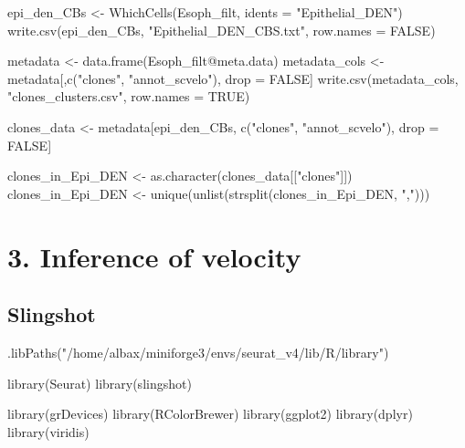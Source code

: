 \documentclass[
  letterpaper,
  DIV=11,
  numbers=noendperiod]{scrreprt}
\newenvironment{Shaded}{\begin{snugshade}}{\end{snugshade}}
\newcommand{\AttributeTok}[1]{\textcolor[rgb]{0.40,0.45,0.13}{#1}}
\newcommand{\ConstantTok}[1]{\textcolor[rgb]{0.56,0.35,0.01}{#1}}
\newcommand{\FunctionTok}[1]{\textcolor[rgb]{0.28,0.35,0.67}{#1}}
\newcommand{\NormalTok}[1]{\textcolor[rgb]{0.00,0.23,0.31}{#1}}
\newcommand{\OtherTok}[1]{\textcolor[rgb]{0.00,0.23,0.31}{#1}}
\newcommand{\SpecialCharTok}[1]{\textcolor[rgb]{0.37,0.37,0.37}{#1}}
\newcommand{\StringTok}[1]{\textcolor[rgb]{0.13,0.47,0.30}{#1}}
\begin{document}
\begin{Shaded}
\begin{Highlighting}[]
\NormalTok{epi\_den\_CBs }\OtherTok{\textless{}{-}} \FunctionTok{WhichCells}\NormalTok{(Esoph\_filt, }\AttributeTok{idents =} \StringTok{"Epithelial\_DEN"}\NormalTok{)}
\FunctionTok{write.csv}\NormalTok{(epi\_den\_CBs, }\StringTok{"Epithelial\_DEN\_CBS.txt"}\NormalTok{, }\AttributeTok{row.names =} \ConstantTok{FALSE}\NormalTok{)}

\NormalTok{metadata }\OtherTok{\textless{}{-}} \FunctionTok{data.frame}\NormalTok{(Esoph\_filt}\SpecialCharTok{@}\NormalTok{meta.data)}
\NormalTok{metadata\_cols }\OtherTok{\textless{}{-}}\NormalTok{ metadata[,}\FunctionTok{c}\NormalTok{(}\StringTok{"clones"}\NormalTok{, }\StringTok{"annot\_scvelo"}\NormalTok{), drop }\OtherTok{=} \ConstantTok{FALSE}\NormalTok{]}
\FunctionTok{write.csv}\NormalTok{(metadata\_cols, }\StringTok{"clones\_clusters.csv"}\NormalTok{, }\AttributeTok{row.names =} \ConstantTok{TRUE}\NormalTok{)}

\NormalTok{clones\_data }\OtherTok{\textless{}{-}}\NormalTok{ metadata[epi\_den\_CBs, }\FunctionTok{c}\NormalTok{(}\StringTok{"clones"}\NormalTok{, }\StringTok{"annot\_scvelo"}\NormalTok{), drop }\OtherTok{=} \ConstantTok{FALSE}\NormalTok{]}

\NormalTok{clones\_in\_Epi\_DEN }\OtherTok{\textless{}{-}} \FunctionTok{as.character}\NormalTok{(clones\_data[[}\StringTok{"clones"}\NormalTok{]])}
\NormalTok{clones\_in\_Epi\_DEN }\OtherTok{\textless{}{-}} \FunctionTok{unique}\NormalTok{(}\FunctionTok{unlist}\NormalTok{(}\FunctionTok{strsplit}\NormalTok{(clones\_in\_Epi\_DEN, }\StringTok{","}\NormalTok{)))}
\end{Highlighting}
\end{Shaded}

\chapter{3. Inference of velocity}\label{inference-of-velocity}

\section{Slingshot}\label{slingshot}

\begin{Shaded}
\begin{Highlighting}[]
\FunctionTok{.libPaths}\NormalTok{(}\StringTok{"/home/albax/miniforge3/envs/seurat\_v4/lib/R/library"}\NormalTok{)}

\FunctionTok{library}\NormalTok{(Seurat)}
\FunctionTok{library}\NormalTok{(slingshot)}

\FunctionTok{library}\NormalTok{(grDevices)}
\FunctionTok{library}\NormalTok{(RColorBrewer)}
\FunctionTok{library}\NormalTok{(ggplot2)}
\FunctionTok{library}\NormalTok{(dplyr)}
\FunctionTok{library}\NormalTok{(viridis)}
\end{Highlighting}
\end{Shaded}
\end{document}
